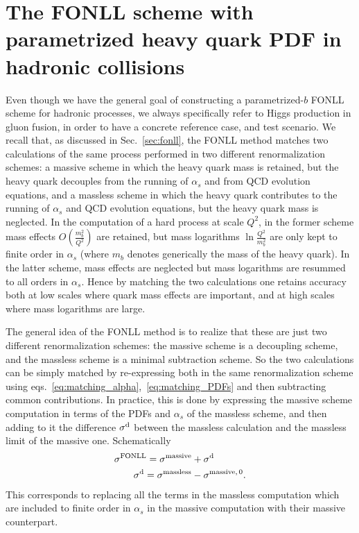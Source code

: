 \section{The FONLL scheme with parametrized heavy quark PDF
  in hadronic collisions}
\label{sec:FONLL-HI}

Even though we have the general goal of constructing a parametrized-$b$
FONLL scheme for hadronic processes, we  always specifically refer to Higgs
production in gluon fusion, in order to have  a concrete reference
case, and  test scenario. We recall that, as discussed in Sec.~\ref{sec:fonll}, the FONLL
method matches two calculations of the same process
performed in two different renormalization schemes: a massive scheme
in which the heavy quark mass is retained, but the heavy quark
decouples from the running of $\alpha_s$ and from QCD evolution
equations, and a massless scheme in which the heavy quark contributes
to the running of $\alpha_s$ and QCD evolution
equations, but the heavy quark mass is neglected.
In the computation of a hard process at scale $Q^2$, in the former scheme
mass effects $O\left(\frac {m_b^2}{Q^2}\right)$
are retained, but mass logarithms $\ln\frac{Q^2}{m_b^2}$
 are only
kept to finite order in $\alpha_s$ (where $m_b$ denotes generically
the mass of the heavy quark). In the latter scheme, mass effects
are neglected but mass logarithms are resummed to all orders in
$\alpha_s$. Hence by matching the two calculations one retains
accuracy both at low scales where quark mass effects are important, and
at high scales where mass logarithms are large.

The general idea of the FONLL method is to realize that these are just
two different renormalization schemes: the massive scheme is a
decoupling scheme, and the massless scheme is a minimal subtraction
scheme. So the two calculations can be simply matched by re-expressing
both in the same renormalization scheme using eqs.~\eqref{eq:matching_alpha},~\eqref{eq:matching_PDFs}
and then subtracting common contributions. In practice, this is done by expressing the massive
scheme computation in terms of the PDFs and $\alpha_s$ of the
massless scheme, and then adding to it the difference $\sigma ^{\rm
  d}$
between the massless calculation and the massless limit of the
massive one. Schematically
\begin{align}\label{eq:fonlldef}
&  \sigma^{\text{FONLL}} = \sigma^{\rm massive} +\sigma ^{\rm d}\\
&\qquad \sigma ^{\rm d}=\sigma^{\rm massless}-\sigma^{\rm massive,\,0}.\label{eq:fonlldiff}
\end{align}
This corresponds to replacing all the terms in the massless
computation which are included to finite order in $\alpha_s$ in the
massive computation with their massive counterpart.

